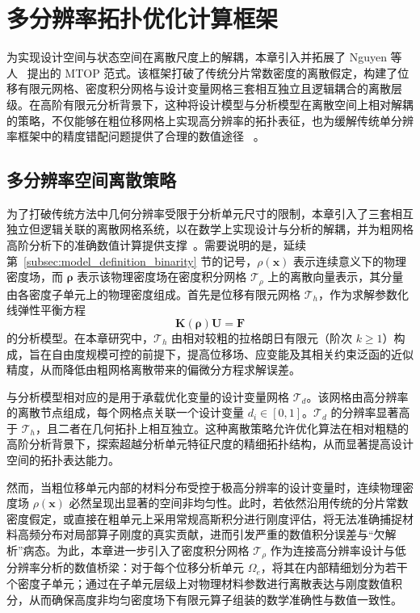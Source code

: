 \section{多分辨率拓扑优化计算框架}
\label{sec:mtop_framework}

为实现设计空间与状态空间在离散尺度上的解耦，本章引入并拓展了 Nguyen 等人~\cite{nguyenComputationalParadigmMultiresolution2010a} 提出的 MTOP 范式。该框架打破了传统分片常数密度的离散假定，构建了位移有限元网格、密度积分网格与设计变量网格三套相互独立且逻辑耦合的离散层级。在高阶有限元分析背景下，这种将设计模型与分析模型在离散空间上相对解耦的策略，不仅能够在粗位移网格上实现高分辨率的拓扑表征，也为缓解传统单分辨率框架中的精度错配问题提供了合理的数值途径
~\cite{nguyenTopologyOptimizationUsing2017a}。


\subsection{多分辨率空间离散策略}
\label{subsec:multires_spatial_discretization}

为了打破传统方法中几何分辨率受限于分析单元尺寸的限制，本章引入了三套相互独立但逻辑关联的离散网格系统，以在数学上实现设计与分析的解耦，并为粗网格高阶分析下的准确数值计算提供支撑~\cite{nguyenComputationalParadigmMultiresolution2010a}。需要说明的是，延续第~\ref{subsec:model_definition_binarity} 节的记号，$\rho(\boldsymbol{x})$ 表示连续意义下的物理密度场，而 $\boldsymbol{\rho}$ 表示该物理密度场在密度积分网格 $\mathcal{T}_\rho$ 上的离散向量表示，其分量由各密度子单元上的物理密度组成。首先是位移有限元网格 $\mathcal{T}_h$，作为求解参数化线弹性平衡方程
\[
\boldsymbol{K}(\boldsymbol{\rho})\boldsymbol{U} = \boldsymbol{F}
\]
的分析模型。在本章研究中，$\mathcal{T}_h$ 由相对较粗的拉格朗日有限元（阶次 $k\geq1$）构成，旨在自由度规模可控的前提下，提高位移场、应变能及其相关约束泛函的近似精度，从而降低由粗网格离散带来的偏微分方程求解误差。

与分析模型相对应的是用于承载优化变量的设计变量网格 $\mathcal{T}_d$。该网格由高分辨率的离散节点组成，每个网格点关联一个设计变量 $d_i \in [0, 1]$。$\mathcal{T}_d$ 的分辨率显著高于 $\mathcal{T}_h$，且二者在几何拓扑上相互独立。这种离散策略允许优化算法在相对粗糙的高阶分析背景下，探索超越分析单元特征尺度的精细拓扑结构，从而显著提高设计空间的拓扑表达能力。

然而，当粗位移单元内部的材料分布受控于极高分辨率的设计变量时，连续物理密度场 $\rho(\boldsymbol{x})$
必然呈现出显著的空间非均匀性。此时，若依然沿用传统的分片常数密度假定，或直接在粗单元上采用常规高斯积分进行刚度评估，将无法准确捕捉材料高频分布对局部算子刚度的真实贡献，进而引发严重的数值积分误差与“欠解析”病态。为此，本章进一步引入了密度积分网格 $\mathcal{T}_\rho$ 作为连接高分辨率设计与低分辨率分析的数值桥梁：对于每个位移分析单元 $\Omega_e$，将其在内部精细划分为若干个密度子单元；通过在子单元层级上对物理材料参数进行离散表达与刚度数值积分，从而确保高度非均匀密度场下有限元算子组装的数学准确性与数值一致性。

